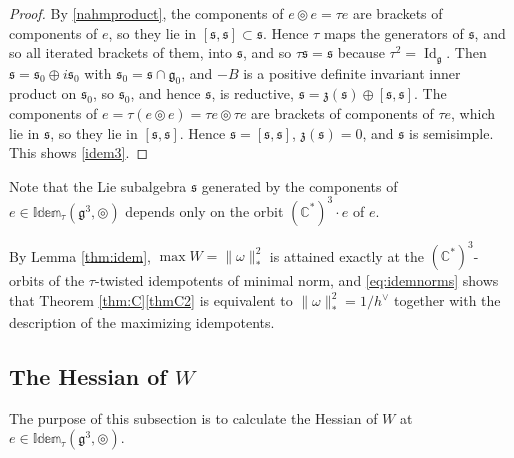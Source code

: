 \documentclass [leqno, 10pt]{amsart}
\theoremstyle{definition}
\numberwithin{equation}{section}
\newcommand{\idem}{\mathbb{Idem}}
\newcommand{\tmlt}{\circledcirc}
\newcommand{\om}{\omega}
\newcommand{\id}{\operatorname{Id}}
\newcommand{\g}{\mathfrak{g}}
\newcommand{\com}{\mathbb C}
\newcommand{\gz}{\g_{0}}
\newcommand{\hv}{h^\vee}
\newcommand{\comass}[1]{\lVert #1\rVert_{\ast}}%
\newcommand{\subs}{\mathfrak{s}}
\begin{document}
\begin{proof}
By \eqref{nahmproduct}, the components of $e \tmlt e = \tau e$ are brackets of components of $e$, so they lie in $[\subs, \subs] \subset \subs$. Hence $\tau$ maps the generators of $\subs$, and so all iterated brackets of them, into $\subs$, and so $\tau\subs = \subs$ because $\tau^{2} = \id_{\g}$. Then $\subs = \subs_{0} \oplus i\subs_{0}$ with $\subs_{0} = \subs \cap \gz$, and $-B$ is a positive definite invariant inner product on $\subs_{0}$, so $\subs_{0}$, and hence $\subs$, is reductive, $\subs = \mathfrak{z}(\subs) \oplus [\subs, \subs]$. The components of $e = \tau(e \tmlt e) = \tau e \tmlt \tau e$ are brackets of components of $\tau e$, which lie in $\subs$, so they lie in $[\subs, \subs]$. Hence $\subs = [\subs, \subs]$, $\mathfrak{z}(\subs) = 0$, and $\subs$ is semisimple. This shows \ref{idem3}.
\end{proof}

Note that the Lie subalgebra $\subs$ generated by the components of $e \in \idem_{\tau}(\g^{3}, \tmlt)$ depends only on the orbit $(\com^{\ast})^{3}\cdot e$ of $e$.

By Lemma \ref{thm:idem}, $\max W = \comass{\om}^{2}$ is attained exactly at the $(\com^{\ast})^{3}$-orbits of the $\tau$-twisted idempotents of minimal norm, and \eqref{eq:idemnorms} shows that Theorem \ref{thm:C}\ref{thmC2} is equivalent to $\comass{\om}^{2} = 1/\hv$ together with the description of the maximizing idempotents.

\subsection{The Hessian of $W$}\label{sec:hessian}
The purpose of this subsection is to calculate the Hessian of $W$ at $e \in \idem_{\tau}(\g^{3}, \tmlt)$.
\end{document}
